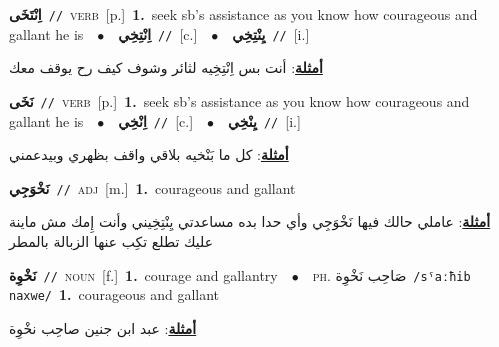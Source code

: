 \documentclass[10pt,a4paper,twoside]{article} %
\begin{document}
\begin{multicols}{2}
{\setlength\topsep{0pt}\textbf{\foreignlanguage{arabic}{اِنْتَخَى}}\ {\color{gray}\texttt{//}\color{black}}\ \textsc{verb}\ [p.]\ \textbf{1.}~seek sb's assistance as you know how courageous and gallant he is\ \ $\bullet$\ \ \setlength\topsep{0pt}\textbf{\foreignlanguage{arabic}{اِنْتِخِي}}\ {\color{gray}\texttt{//}\color{black}}\ [c.]\ \ $\bullet$\ \ \setlength\topsep{0pt}\textbf{\foreignlanguage{arabic}{يِنْتِخِي}}\ {\color{gray}\texttt{//}\color{black}}\ [i.]\  \begin{flushright}\color{gray}\foreignlanguage{arabic}{\textbf{\underline{\foreignlanguage{arabic}{أمثلة}}}: أنت بس اِنْتِخِيه لثائر وشوف كيف رح يوقف معك}\end{flushright}\color{black}} \vspace{2mm}

{\setlength\topsep{0pt}\textbf{\foreignlanguage{arabic}{نَخَى}}\ {\color{gray}\texttt{//}\color{black}}\ \textsc{verb}\ [p.]\ \textbf{1.}~seek sb's assistance as you know how courageous and gallant he is\ \ $\bullet$\ \ \setlength\topsep{0pt}\textbf{\foreignlanguage{arabic}{اِنْخِي}}\ {\color{gray}\texttt{//}\color{black}}\ [c.]\ \ $\bullet$\ \ \setlength\topsep{0pt}\textbf{\foreignlanguage{arabic}{يِنْخِي}}\ {\color{gray}\texttt{//}\color{black}}\ [i.]\  \begin{flushright}\color{gray}\foreignlanguage{arabic}{\textbf{\underline{\foreignlanguage{arabic}{أمثلة}}}: كل ما بَنْخيه بلاقي واقف بظهري وبيدعمني}\end{flushright}\color{black}} \vspace{2mm}

{\setlength\topsep{0pt}\textbf{\foreignlanguage{arabic}{نَخْوَجِي}}\ {\color{gray}\texttt{//}\color{black}}\ \textsc{adj}\ [m.]\ \textbf{1.}~courageous and gallant\  \begin{flushright}\color{gray}\foreignlanguage{arabic}{\textbf{\underline{\foreignlanguage{arabic}{أمثلة}}}: عاملي حالك فيها نَخْوَجِي وأي حدا بده مساعدتي يِنْتِخِيني وأنت إِمك مش ماينة عليك تطلع تكِب عنها الزبالة بالمطر}\end{flushright}\color{black}} \vspace{2mm}

{\setlength\topsep{0pt}\textbf{\foreignlanguage{arabic}{نَخْوِة}}\ {\color{gray}\texttt{//}\color{black}}\ \textsc{noun}\ [f.]\ \textbf{1.}~courage and gallantry\ \ $\bullet$\ \ \textsc{ph.} \color{gray} \foreignlanguage{arabic}{صَاحِب نَخْوِة}\color{black}\ {\color{gray}\texttt{/{\sffamily sˤaːħib naxwe}/}\color{black}}\ \textbf{1.}~courageous and gallant\  \begin{flushright}\color{gray}\foreignlanguage{arabic}{\textbf{\underline{\foreignlanguage{arabic}{أمثلة}}}: عبد ابن جنين صاحِب نخْوِة}\end{flushright}\color{black}} \vspace{2mm}


\end{multicols}
\end{document}
